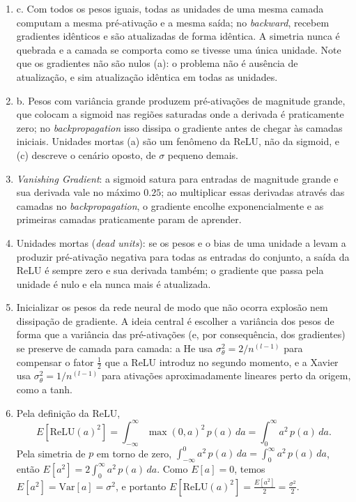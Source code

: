 \documentclass{dlproblemset}
\begin{document}
\begin{enumerate}[1)]
    \item c. Com todos os pesos iguais, todas as unidades de uma mesma camada computam a mesma pré-ativação e a mesma saída; no \textit{backward}, recebem gradientes idênticos e são atualizadas de forma idêntica. A simetria nunca é quebrada e a camada se comporta como se tivesse uma única unidade. Note que os gradientes não são nulos (a): o problema não é ausência de atualização, e sim atualização idêntica em todas as unidades.

    \item b. Pesos com variância grande produzem pré-ativações de magnitude grande, que colocam a sigmoid nas regiões saturadas onde a derivada é praticamente zero; no \textit{backpropagation} isso dissipa o gradiente antes de chegar às camadas iniciais. Unidades mortas (a) são um fenômeno da ReLU, não da sigmoid, e (c) descreve o cenário oposto, de $\sigma$ pequeno demais.

    \item \textit{Vanishing Gradient}: a sigmoid satura para entradas de magnitude grande e sua derivada vale no máximo $0.25$; ao multiplicar essas derivadas através das camadas no \textit{backpropagation}, o gradiente encolhe exponencialmente e as primeiras camadas praticamente param de aprender.

    \item Unidades mortas (\textit{dead units}): se os pesos e o bias de uma unidade a levam a produzir pré-ativação negativa para todas as entradas do conjunto, a saída da ReLU é sempre zero e sua derivada também; o gradiente que passa pela unidade é nulo e ela nunca mais é atualizada.

    \item Inicializar os pesos da rede neural de modo que não ocorra explosão nem dissipação de gradiente. A ideia central é escolher a variância dos pesos de forma que a variância das pré-ativações (e, por consequência, dos gradientes) se preserve de camada para camada: a He usa $\sigma_\theta^2 = 2/n^{(l-1)}$ para compensar o fator $\frac{1}{2}$ que a ReLU introduz no segundo momento, e a Xavier usa $\sigma_\theta^2 = 1/n^{(l-1)}$ para ativações aproximadamente lineares perto da origem, como a tanh.

    \item Pela definição da ReLU,
    \begin{equation*}
        E[\mathrm{ReLU}(a)^2]=\int_{-\infty}^{\infty}\max(0,a)^2\,p(a)\,da=\int_{0}^{\infty}a^2\,p(a)\,da.
    \end{equation*}
    Pela simetria de $p$ em torno de zero, $\int_{-\infty}^{0}a^2\,p(a)\,da=\int_{0}^{\infty}a^2\,p(a)\,da$, então $E[a^2]=2\int_{0}^{\infty}a^2\,p(a)\,da$. Como $E[a]=0$, temos $E[a^2]=\mathrm{Var}[a]=\sigma^2$, e portanto $E[\mathrm{ReLU}(a)^2]=\frac{E[a^2]}{2}=\frac{\sigma^2}{2}$.


\end{enumerate}
\end{document}
